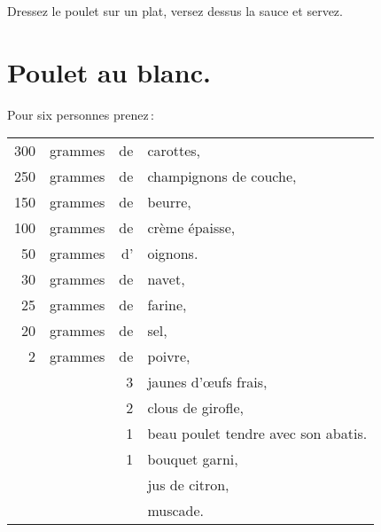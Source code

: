 Dressez le poulet sur un plat, versez dessus la sauce et servez.

\section*{\centering Poulet au blanc.}
{}

Pour six personnes prenez :

\medskip

\footnotesize
\begin{longtable}{rrrp{16em}}
    300 & grammes & de & carottes,                                                                        \\
    250 & grammes & de & champignons de couche,                                                           \\
    150 & grammes & de & beurre,                                                                          \\
    100 & grammes & de & crème épaisse,                                                                   \\
     50 & grammes & d' & oignons.                                                                         \\
     30 & grammes & de & navet,                                                                           \\
     25 & grammes & de & farine,                                                                          \\
     20 & grammes & de & sel,                                                                             \\
      2 & grammes & de & poivre,                                                                          \\
        &         &  3 & jaunes d'œufs frais,                                                             \\
        &         &  2 & clous de girofle,                                                                \\
        &         &  1 & beau poulet tendre avec son abatis.                                              \\
        &         &  1 & bouquet garni,                                                                   \\
        &         &    & jus de citron,                                                                   \\
        &         &    & muscade.                                                                         \\
\end{longtable}
\normalsize

